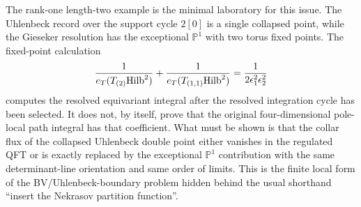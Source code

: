\begin{controlledapproximation}
The rank-one length-two example is the minimal laboratory for this issue.
The Uhlenbeck record over the support cycle \(2[0]\) is a single collapsed
point, while the Gieseker resolution has the exceptional
\(\mathbb P^1\) with two torus fixed points.  The fixed-point calculation
\[
  \frac1{e_T(T_{(2)}{\rm Hilb}^2)}
  +
  \frac1{e_T(T_{(1,1)}{\rm Hilb}^2)}
  =
  \frac1{2\epsilon_1^2\epsilon_2^2}
\]
computes the resolved equivariant integral after the resolved integration
cycle has been selected.  It does not, by itself, prove that the original
four-dimensional pole-local path integral has that coefficient.  What must be
shown is that the collar flux of the collapsed Uhlenbeck double point either
vanishes in the regulated QFT or is exactly replaced by the exceptional
\(\mathbb P^1\) contribution with the same determinant-line orientation and
same order of limits.  This is the finite local form of the
BV/Uhlenbeck-boundary problem hidden behind the usual shorthand
``insert the Nekrasov partition function''.
\end{controlledapproximation}

